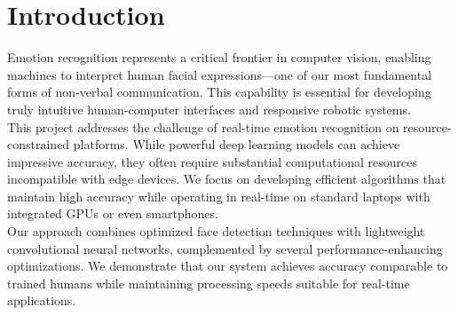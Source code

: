 \section{Introduction}
Emotion recognition represents a critical frontier in computer vision, enabling machines to interpret human facial expressions—one of our most fundamental forms of non-verbal communication. This capability is essential for developing truly intuitive human-computer interfaces and responsive robotic systems.\\

This project addresses the challenge of real-time emotion recognition on resource-constrained platforms. While powerful deep learning models can achieve impressive accuracy, they often require substantial computational resources incompatible with edge devices. We focus on developing efficient algorithms that maintain high accuracy while operating in real-time on standard laptops with integrated GPUs or even smartphones.\\

Our approach combines optimized face detection techniques with lightweight convolutional neural networks, complemented by several performance-enhancing optimizations. We demonstrate that our system achieves accuracy comparable to trained humans while maintaining processing speeds suitable for real-time applications.